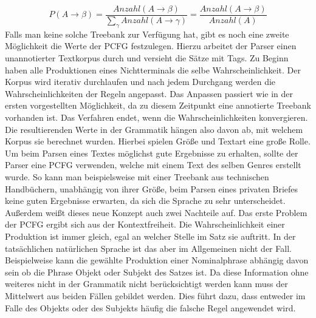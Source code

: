 \[ P(A \to \beta) = \frac{Anzahl(A \to \beta)}{ \sum_{\gamma} Anzahl(A \to \gamma)} = \frac{Anzahl(A \to \beta)}{Anzahl(A)} \]
Falls man keine solche Treebank zur Verfügung hat, gibt es noch eine zweite Möglichkeit die Werte der PCFG festzulegen. Hierzu arbeitet der Parser einen unannotierter Textkorpus durch und versieht die Sätze mit Tags. Zu Beginn haben alle Produktionen eines Nichtterminals die selbe Wahrscheinlichkeit. Der Korpus wird iterativ durchlaufen und nach jedem Durchgang werden die Wahrscheinlichkeiten der Regeln angepasst. Das Anpassen passiert wie in der ersten vorgestellten Möglichkeit, da zu diesem Zeitpunkt eine annotierte Treebank vorhanden ist. Das Verfahren endet, wenn die Wahrscheinlichkeiten konvergieren. \\
Die resultierenden Werte in der Grammatik hängen also davon ab, mit welchem Korpus sie berechnet wurden. Hierbei spielen Größe und Textart eine große Rolle. Um beim Parsen eines Textes möglichst gute Ergebnisse zu erhalten, sollte der Parser eine PCFG verwenden, welche mit einem Text des selben Genres erstellt wurde. So kann man beispielsweise mit einer Treebank aus technischen Handbüchern, unabhängig von ihrer Größe, beim Parsen eines privaten Briefes keine guten Ergebnisse erwarten, da sich die Sprache zu sehr unterscheidet.\\ %
Außerdem weißt dieses neue Konzept auch zwei Nachteile auf.
Das erste Problem der PCFG ergibt sich aus der Kontextfreiheit. Die Wahrscheinlichkeit einer Produktion ist immer gleich, egal an welcher Stelle im Satz sie auftritt. In der tatsächlichen natürlichen Sprache ist das aber im Allgemeinen nicht der Fall. Beispielweise kann die gewählte Produktion einer Nominalphrase abhängig davon sein ob die Phrase Objekt oder Subjekt des Satzes ist. Da diese Information ohne weiteres nicht in der Grammatik nicht berücksichtigt werden kann muss der Mittelwert aus beiden Fällen gebildet werden. Dies führt dazu, dass entweder im Falle des Objekts oder des Subjekts häufig die falsche Regel angewendet wird. 
